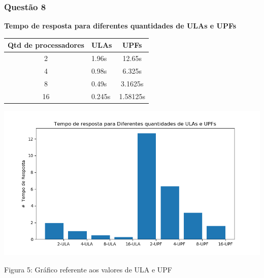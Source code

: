 \subsubsection{Questão 8}
\vspace{0.5cm}
\begin{center}
    \vspace{0.2cm}
    \centering
    \begin{small}
         \textbf{Tempo de resposta para diferentes quantidades de ULAs e UPFs} \label{Tabela1}
        \hline
         \vspace{0.5cm}
            \begin{tabular}{|c|l|c|}
            \hline
            Qtd de processadores            & ULAs & UPFs\\
            \hline
            2             & 1.96s  & 12.65s\\
            4             & 0.98s  & 6.325s\\
            8             & 0.49s    & 3.1625s\\
            16            & 0.245s      & 1.58125s\\  
            \hline
        \end{tabular}
    \end{small}
\end{center}
\centerline{\includegraphics[width=180mm]{images/performance_gain.png}}
\centerline{Figura 5: Gráfico referente aos valores de ULA e UPF}
\vspace{0.5cm}

